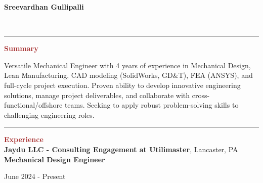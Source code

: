 \documentclass[11pt, letterpaper]{article}
\begin{document}
\begin{centering}
{\hfill{\huge \textbf{Sreevardhan Gullipalli}}\vspace{2pt}\hfill}
\end{centering}
\begin{flushleft}
%
\\ %
\end{flushleft}
\vspace{-8pt}
\noindent \rule[2pt]{\textwidth}{0.5pt} \vspace{-8mm}
\noindent \textbf{\large \textcolor{Brown}{Summary}}\vspace{2pt}\\
\begin{justify}
Versatile Mechanical Engineer with 4 years of experience in Mechanical Design, Lean Manufacturing, CAD modeling (SolidWorks, GD\&T), FEA (ANSYS), and full-cycle project execution. Proven ability to develop innovative engineering solutions, manage project deliverables, and collaborate with cross-functional/offshore teams. Seeking to apply robust problem-solving skills to challenging engineering roles.
\end{justify}
\vspace{-8pt}
\noindent \rule[2pt]{\textwidth}{0.5pt}
\noindent \textbf{\large \textcolor{Brown}{Experience}}\vspace{4pt}\\
\textbf{Jaydu LLC - Consulting Engagement at Utilimaster}, Lancaster, PA\\
\textbf{Mechanical Design Engineer}\hfill \raggedright{June 2024 - Present}\\ %
\end{document}
